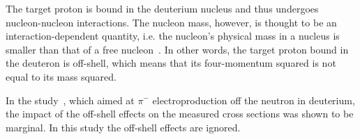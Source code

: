 The target proton is bound in the deuterium nucleus and thus undergoes nucleon-nucleon interactions. The nucleon mass, however, is thought to be an interaction-dependent quantity, i.e. the nucleon's physical mass in a nucleus is smaller than that of a free nucleon~\cite{Noble:1980my}. In other words, the target proton bound in the deuteron is off-shell, which means that its four-momentum squared is not equal to its mass squared.

In the study~\cite{Ye_Tian:2017}, which aimed at $\pi^{-}$ electroproduction off the neutron in deuterium, the impact of the off-shell effects on the measured cross sections was shown to be marginal. In this study the off-shell effects are ignored.














